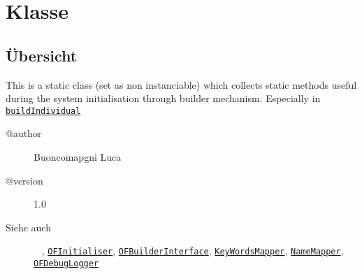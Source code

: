 
\section[OFBuilderCommon]{Klasse }\label{ontologyFramework.OFRunning.OFInitialising.OFBuilderCommon-class}
\subsection{Übersicht}
\par 
 This is a static class (set as non instanciable) which collects
 static methods useful during the system initialisation through 
 builder mechanism. Especially in \texttt{\hyperlink{ontologyFramework.OFRunning.OFInitialising.OFInitialiser.buildIndividual(org.semanticweb.owlapi.model.OWLNamedIndividual,ontologyFramework.OFContextManagement.OWLReferences)}{buildIndividual}} 
 
 \par 
\begin{description}
\item[@author] 
Buoncomapgni Luca
\item[@version] 
1.0
\item[Siehe auch] ~
\noprint, \texttt{\hyperlink{ontologyFramework.OFRunning.OFInitialising.OFInitialiser-class}{OFInitialiser}}, \texttt{\hyperlink{ontologyFramework.OFRunning.OFInitialising.OFBuilderInterface<T>-class}{OFBuilderInterface}}, \texttt{\hyperlink{ontologyFramework.OFDataMapping.ReservatedDataType.KeyWordsMapper-class}{KeyWordsMapper}}, \texttt{\hyperlink{ontologyFramework.OFDataMapping.ReservatedDataType.NameMapper-class}{NameMapper}}, \texttt{\hyperlink{ontologyFramework.OFErrorManagement.OFDebugLogger-class}{OFDebugLogger}}\end{description}
